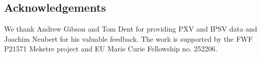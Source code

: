 \subsection*{Acknowledgements}

We thank Andrew Gibson and Tom Dent for providing PXV and IPSV data and Joachim Neubert for his valuable feedback. The work is supported by the FWF P21571 Meketre project and EU Marie Curie Fellowship no. 252206.

